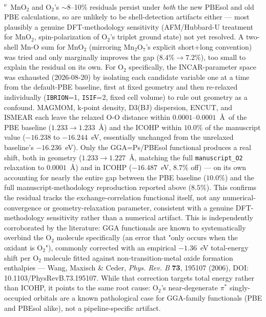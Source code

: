 \noindent\textsuperscript{e}~MnO$_2$ and O$_2$'s $\sim$8--10\% residuals persist under \emph{both} the new PBEsol and old PBE calculations, so are unlikely to be shell-detection artifacts either --- most plausibly a genuine DFT-methodology sensitivity (AFM/Hubbard-U treatment for MnO$_2$, spin-polarization of O$_2$'s triplet ground state) not yet resolved. A two-shell Mn-O sum for MnO$_2$ (mirroring Mn$_2$O$_7$'s explicit short+long convention) was tried and only marginally improves the gap ($8.4\%\to7.2\%$), too small to explain the residual on its own. For O$_2$ specifically, the INCAR-parameter space was exhausted (2026-08-20) by isolating each candidate variable one at a time from the default-PBE baseline, first at fixed geometry and then re-relaxed individually (\texttt{IBRION}=1, \texttt{ISIF}=2, fixed cell volume) to rule out geometry as a confound. MAGMOM, k-point density, D3(BJ) dispersion, ENCUT, and ISMEAR each leave the relaxed O-O distance within $0.0001$--$0.0001$~\AA\ of the PBE baseline ($1.233\to1.233$~\AA) and the ICOHP within $10.0\%$ of the manuscript value ($-16.238$ to $-16.244$~eV, essentially unchanged from the unrelaxed baseline's $-16.236$~eV). Only the GGA=Ps/PBEsol functional produces a real shift, both in geometry ($1.233\to1.227$~\AA, matching the full \texttt{manuscript\_O2} relaxation to $0.0001$~\AA) and in ICOHP ($-16.487$~eV, $8.7\%$ off) --- on its own accounting for nearly the entire gap between the PBE baseline ($10.0\%$) and the full manuscript-methodology reproduction reported above ($8.5\%$). This confirms the residual tracks the exchange-correlation functional itself, not any numerical-convergence or geometry-relaxation parameter, consistent with a genuine DFT-methodology sensitivity rather than a numerical artifact. This is independently corroborated by the literature: GGA functionals are known to systematically overbind the O$_2$ molecule specifically (an error that "only occurs when the oxidant is O$_2$"), commonly corrected with an empirical $-1.36$~eV total-energy shift per O$_2$ molecule fitted against non-transition-metal oxide formation enthalpies --- Wang, Maxisch \& Ceder, \emph{Phys. Rev. B} \textbf{73}, 195107 (2006), DOI: 10.1103/PhysRevB.73.195107. While that correction targets total energy rather than ICOHP, it points to the same root cause: O$_2$'s near-degenerate $\pi^*$ singly-occupied orbitals are a known pathological case for GGA-family functionals (PBE and PBEsol alike), not a pipeline-specific artifact.

